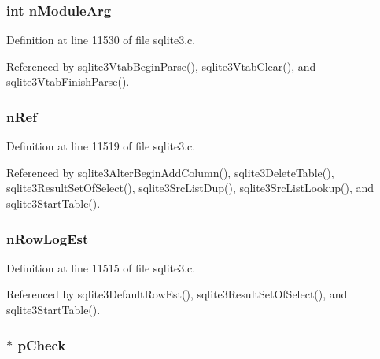\hypertarget{struct_table_a14a173059f6fd84cc6cd6bd8afdb22e6}{}
\subsubsection[{n\+Module\+Arg}]{\setlength{\rightskip}{0pt plus 5cm}int n\+Module\+Arg}\label{struct_table_a14a173059f6fd84cc6cd6bd8afdb22e6}


Definition at line 11530 of file sqlite3.\+c.



Referenced by sqlite3\+Vtab\+Begin\+Parse(), sqlite3\+Vtab\+Clear(), and sqlite3\+Vtab\+Finish\+Parse().

\hypertarget{struct_table_ac2eee41dc41e1b46e339e947bf3e792f}{}
\subsubsection[{n\+Ref}]{ n\+Ref}\label{struct_table_ac2eee41dc41e1b46e339e947bf3e792f}


Definition at line 11519 of file sqlite3.\+c.



Referenced by sqlite3\+Alter\+Begin\+Add\+Column(), sqlite3\+Delete\+Table(), sqlite3\+Result\+Set\+Of\+Select(), sqlite3\+Src\+List\+Dup(), sqlite3\+Src\+List\+Lookup(), and sqlite3\+Start\+Table().

\hypertarget{struct_table_ac2127b14f276f530c81bd417d54d7ff6}{}
\subsubsection[{n\+Row\+Log\+Est}]{ n\+Row\+Log\+Est}\label{struct_table_ac2127b14f276f530c81bd417d54d7ff6}


Definition at line 11515 of file sqlite3.\+c.



Referenced by sqlite3\+Default\+Row\+Est(), sqlite3\+Result\+Set\+Of\+Select(), and sqlite3\+Start\+Table().

\hypertarget{struct_table_abdb4a0cc96d88f28033ed144b65d62e9}{}
\subsubsection[{p\+Check}]{$\ast$ p\+Check}\label{struct_table_abdb4a0cc96d88f28033ed144b65d62e9}


